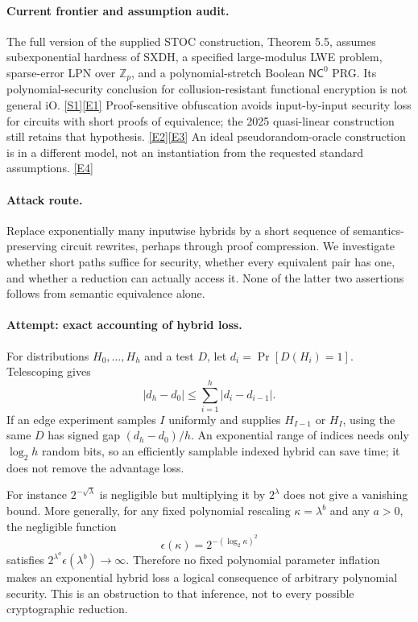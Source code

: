 \documentclass[11pt,a4paper]{article}
\newcommand{\Z}{\mathbb{Z}}
\newcommand{\sref}[2]{\hyperlink{source:#1:#2}{[S#2]}}
\newcommand{\eref}[2]{\hyperlink{extra:#1:#2}{[E#2]}}
\numberwithin{equation}{section}
\begin{document}
\paragraph{Current frontier and assumption audit.}
The full version of the supplied STOC construction, Theorem 5.5, assumes
subexponential hardness of SXDH, a specified large-modulus LWE problem,
sparse-error LPN over $\Z_p$, and a polynomial-stretch Boolean
$\mathsf{NC}^0$ PRG. Its polynomial-security conclusion for collusion-resistant
functional encryption is not general iO. \sref{30006749}{1}\eref{30006749}{1}
Proof-sensitive obfuscation avoids input-by-input security loss for circuits
with short proofs of equivalence; the 2025 quasi-linear construction still
retains that hypothesis. \eref{30006749}{2}\eref{30006749}{3}
An ideal pseudorandom-oracle construction is in a different model, not an
instantiation from the requested standard assumptions. \eref{30006749}{4}

\paragraph{Attack route.}
Replace exponentially many inputwise hybrids by a short sequence of
semantics-preserving circuit rewrites, perhaps through proof compression.
We investigate whether short paths suffice for security, whether every
equivalent pair has one, and whether a reduction can actually access it.
None of the latter two assertions follows from semantic equivalence alone.

\paragraph{Attempt: exact accounting of hybrid loss.}
For distributions $H_0,\ldots,H_h$ and a test $D$, let
$d_i=\Pr[D(H_i)=1]$. Telescoping gives
\begin{equation}\label{30006749:hybrid}
 |d_h-d_0|\le\sum_{i=1}^h|d_i-d_{i-1}|.
\end{equation}
If an edge experiment samples $I$ uniformly and supplies $H_{I-1}$ or $H_I$,
using the same $D$ has signed gap $(d_h-d_0)/h$. An exponential range of
indices needs only $\log_2h$ random bits, so an efficiently samplable indexed
hybrid can save time; it does not remove the advantage loss.

For instance $2^{-\sqrt\lambda}$ is negligible but multiplying it by
$2^\lambda$ does not give a vanishing bound. More generally, for any fixed
polynomial rescaling $\kappa=\lambda^b$ and any $a>0$, the negligible function
\[
 \epsilon(\kappa)=2^{-(\log_2\kappa)^2}
\]
satisfies $2^{\lambda^a}\epsilon(\lambda^b)\to\infty$. Therefore no fixed
polynomial parameter inflation makes an exponential hybrid loss a logical
consequence of arbitrary polynomial security. This is an obstruction to
that inference, not to every possible cryptographic reduction.
\end{document}

